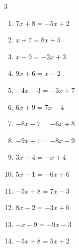 \begin{multicols}{3}
\begin{enumerate}
  \item $7x+8=-5x+2$


  \item $x+7=8x+5$


  \item $x-9=-2x+3$

        \phantom{$\displaystyle x=4$}

  \item $9x+6=x-2$

        \phantom{$\displaystyle x=-1$}

  \item $-4x-3=-3x+7$

        \phantom{$\displaystyle x=-10$}

  \item $6x+9=7x-4$

        \phantom{$\displaystyle x=13$}

  \item $-8x-7=-6x+8$


  \item $-9x+1=-8x-9$

        \phantom{$\displaystyle x=10$}

  \item $3x-4=-x+4$

        \phantom{$\displaystyle x=2$}

  \item $5x-1=-6x+6$


\columnbreak %

  \item $-5x+8=7x-3$


  \item $8x-2=-3x+6$


  \item $-x-9=-9x-3$


  \item $-5x+8=5x+2$



\end{enumerate}
\end{multicols}
